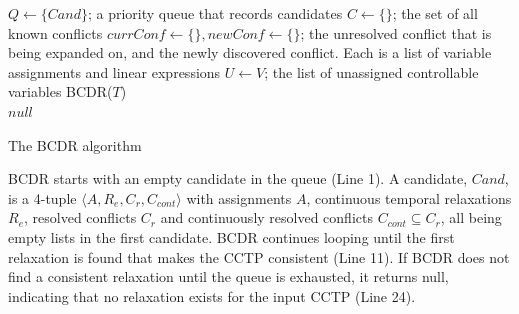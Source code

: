 \documentclass[jair,twoside,11pt,theapa]{article}
\let\oldnl\nl%
\newcommand{\nonl}{\renewcommand{\nl}{\let\nl\oldnl}}%
\begin{document}
	
\begin{algorithm}[h!]
		
\SetAlgoLined
{}
\Indm
{}
\Initialize{}
\;
{$Q\leftarrow\{\mathit{Cand}\}$; a priority queue that records candidates}\;
{$C\leftarrow\{\}$; the set of all known conflicts}\;
{$\mathit{currConf}\leftarrow \{\}, \mathit{newConf}\leftarrow \{\}$; the unresolved conflict that is being expanded on, and the newly discovered conflict. Each is a list of variable assignments and linear expressions}\;
{$U\leftarrow V$; the list of unassigned controllable variables}\;
\Indm
\Algorithm{}
\nonl\textsc{BCDR}($\mathit{T}$)\\
\Indp
{}
\Return $null$\;
\caption{The BCDR algorithm}
\label{alg:bcdr}
\end{algorithm}

BCDR starts with an empty candidate in the queue (Line 1). A candidate, $\mathit{Cand}$,
is a 4-tuple $\langle A,R_e,C_r,C_{cont}\rangle $ with assignments $A$, continuous temporal
relaxations $R_e$, resolved conflicts $C_r$ and continuously resolved conflicts
$C_{cont}\subseteq C_r$, all being empty lists in the first candidate. BCDR
continues looping until the first relaxation is found that makes the CCTP
consistent (Line 11). If BCDR does not find a consistent relaxation until the
queue is exhausted, it returns null, indicating that no relaxation exists for the
input CCTP (Line 24).
\end{document}
